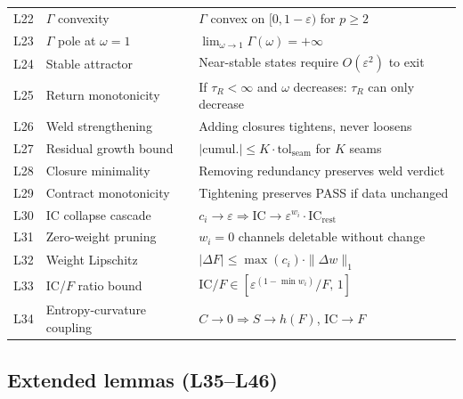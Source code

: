 \documentclass[
  aps,
  prd,
  twocolumn,
  superscriptaddress,
  nofootinbib,
  floatfix
]{revtex4-2}
\newcommand{\tR}{\tau_{\!R}}
\newcommand{\Gam}{\Gamma}
\newcommand{\eps}{\varepsilon}
\newcommand{\tolseam}{\mathrm{tol}_{\mathrm{seam}}}
\newcommand{\IC}{\mathrm{IC}}
\begin{document}
{\begin{center}
\begin{tabular}{@{}clP{3.5cm}@{}}
L22 & $\Gam$ convexity &
  $\Gam$ convex on $[0, 1{-}\eps)$ for $p \geq 2$ \\
L23 & $\Gam$ pole at $\omega = 1$ &
  $\lim_{\omega\to1}\Gam(\omega) = +\infty$ \\
L24 & Stable attractor &
  Near-stable states require $O(\eps^2)$ to exit \\
L25 & Return monotonicity &
  If $\tR < \infty$ and $\omega$ decreases:
  $\tR$ can only decrease \\
L26 & Weld strengthening &
  Adding closures tightens, never loosens \\
L27 & Residual growth bound &
  $|\text{cumul.}| \leq K \cdot \tolseam$ for $K$ seams \\
L28 & Closure minimality &
  Removing redundancy preserves weld verdict \\
L29 & Contract monotonicity &
  Tightening preserves PASS if data unchanged \\
L30 & IC collapse cascade &
  $c_i \to \eps \Longrightarrow
  \IC \to \eps^{w_i} \cdot \IC_\mathrm{rest}$ \\
L31 & Zero-weight pruning &
  $w_i = 0$ channels deletable without change \\
L32 & Weight Lipschitz &
  $|\Delta F| \leq \max(c_i) \cdot \|\Delta w\|_1$ \\
L33 & IC/$F$ ratio bound &
  $\IC/F \in [\eps^{(1-\min w_i)}/F, \, 1]$ \\
L34 & Entropy-curvature coupling &
  $C \to 0 \Longrightarrow S \to h(F)$, $\IC \to F$ \\
\bottomrule
\end{tabular}
\end{center}}

\subsection{Extended lemmas (L35--L46)}
\end{document}
